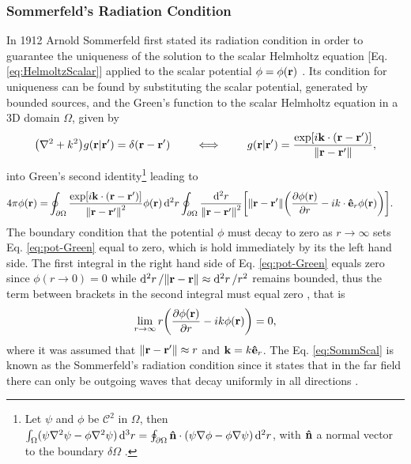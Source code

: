 


\subsubsection{Sommerfeld's Radiation Condition}

In 1912 Arnold Sommerfeld first stated its radiation condition in order to guarantee the uniqueness of the solution to the scalar Helmholtz equation [Eq. \eqref{eq:HelmoltzScalar}] applied to the scalar potential $\phi = \phi(\vb{r})$ \cite{schot_eighty_1992}. Its condition for uniqueness can be found by substituting the scalar potential, generated by bounded sources, and the Green's function to the scalar Helmholtz equation in a 3D domain $\Omega$, given by \cite{zangwill_modern_2013,jackson_classical_1999}
%
\begin{align}
    \qty(\nabla^2 + k^2) g(\vb{r}|\vb{r}')   = \delta(\vb{r}-\vb{r}')
        \qquad
        \iff
        \qquad
    g(\vb{r}|\vb{r}')   = \frac{\exp[i\vb{k}\cdot(\vb{r}-\vb{r}')]}{\norm{\vb{r}-\vb{r}'}},
\end{align}
%
into Green's second identity\footnote{%
        Let $\psi$ and $\phi$ be $\mathcal{C}^2$ in $\Omega$, then %
        $\int_\Omega (\psi\nabla^2\psi-\phi\nabla^2\psi)\dd[3]{r} = %
        \oint_{\partial\Omega}\vu{n}\cdot(\psi\nabla\phi-\phi\nabla\psi)\dd[2]{r}$, with $\vu{n}$ a normal vector to the boundary $\delta\Omega$  \cite{zangwill_modern_2013}.} %
 leading to
\begin{align}
    4\pi \phi(\vb{r}) =& \oint_{\partial\Omega}  \frac{\exp[i\vb{k}\cdot(\vb{r}-\vb{r}')]}{\norm{\vb{r}-\vb{r}'}^2} \phi(\vb{r}) \dd[2]{r}
                 \oint_{\partial\Omega} \frac{\dd[2]{r}}{\norm{\vb{r}-\vb{r}'}^2} \qty[\norm{\vb{r}-\vb{r}'}\qty(\pdv{ \phi(\vb{r})}{r}-ik\cdot\vu{e}_r \phi(\vb{r})) ].
    \label{eq:pot-Green}
\end{align}
%
The boundary condition that the potential $\phi$ must decay to zero as $r\to\infty$ sets Eq. \eqref{eq:pot-Green} equal to zero, which is  hold immediately by its the left hand side. The first integral in the right hand side of Eq. \eqref{eq:pot-Green} equals zero since $\phi(r\to 0 ) = 0$ while $\dd[2]{r}/\norm{\vb{r}-\vb{r}}\approx\dd[2]{r}/r^2$ remains bounded, thus the term between brackets in the second integral must equal zero \cite{schot_eighty_1992}, that is
%
\begin{align}
    \lim_{r\to \infty} r\qty(\pdv{\phi(\vb{r})}{r} - ik\phi(\vb{r})) = 0,
    \label{eq:SommScal}
\end{align}
%
where it was assumed that $\norm{\vb{r}-\vb{r}'} \approx r$ and $\vb{k} = k \vu{e}_r$. The Eq. \eqref{eq:SommScal} is known as the Sommerfeld's radiation condition since it states that in the far field there can only be outgoing waves that decay uniformly in all directions \cite{schot_eighty_1992,jin_theory_2010,bondeson_computational_2005}.

